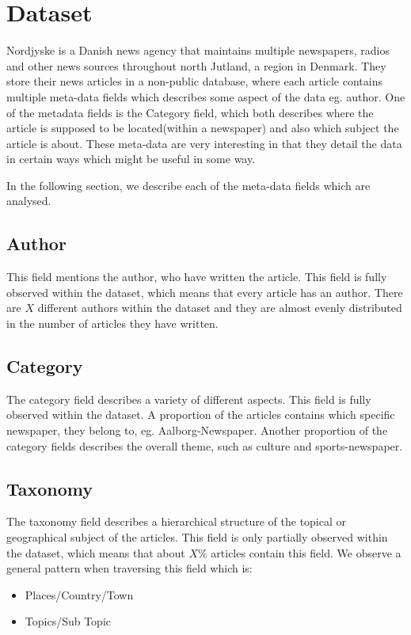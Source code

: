 \section{Dataset}
Nordjyske is a Danish news agency that maintains multiple newspapers, radios and other news sources throughout north Jutland, a region in Denmark.
They store their news articles in a non-public database, where each article contains multiple meta-data fields which describes some aspect of the data eg. author.
One of the metadata fields is the Category field, which both describes where the article is supposed to be located(within a newspaper) and also which subject the article is about.
These meta-data are very interesting in that they detail the data in certain ways which might be useful in some way.

In the following section, we describe each of the meta-data fields which are analysed.

\subsection{Author}
This field mentions the author, who have written the article.
This field is fully observed within the dataset, which means that every article has an author.
There are $X$ different authors within the dataset and they are almost evenly distributed in the number of articles they have written.

\subsection{Category}
The category field describes a variety of different aspects. 
This field is fully observed within the dataset.
A proportion of the articles contains which specific newspaper, they belong to, eg. Aalborg-Newspaper.
Another proportion of the category fields describes the overall theme, such as culture and sports-newspaper.

\subsection{Taxonomy}
The taxonomy field describes a hierarchical structure of the topical or geographical subject of the articles.
This field is only partially observed within the dataset, which means that about $X\%$ articles contain this field.
We observe a general pattern when traversing this field which is:
\begin{itemize}
	\item Places/Country/Town
	\item Topics/Sub Topic
\end{itemize}